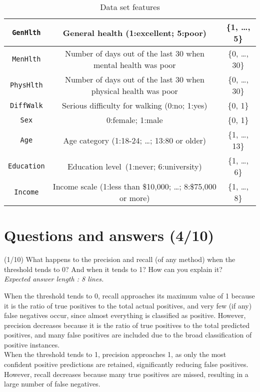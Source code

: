 \documentclass [a4paper, 11pt] {article}
\begin{document}
\begin{table}[htpb]
\begin{tabular}{|c|c|c|}
\hline
\texttt{GenHlth} & General health (1:excellent; 5:poor) & \{1, \dots, 5\} \\ 
\hline
\texttt{MenHlth} & Number of days out of the last 30 when mental health was poor & \{0, \dots, 30\} \\ 
\hline
\texttt{PhysHlth} & Number of days out of the last 30 when physical health was poor & \{0, \dots, 30\} \\ 
\hline
\texttt{DiffWalk} & Serious difficulty for walking (0:no; 1:yes) & \{0, 1\} \\ 
\hline
\texttt{Sex} & 0:female; 1:male & \{0, 1\} \\ 
\hline
\texttt{Age} & Age category (1:18-24; \dots; 13:80 or older) & \{1, \dots, 13\} \\ 
\hline
\texttt{Education} & Education level~(1:never; 6:university) & \{1, \dots, 6\} \\ 
\hline
\texttt{Income} & Income scale (1:less than \$10,000; \dots; 8:\$75,000 or more) & \{1, \dots, 8\} \\
\hline
    \end{tabular}
    \caption{Data set features}
    \label{tab:featuresList}
\end{table}
\clearpage
\section{Questions and answers (4/10)}

\begin{question}{2.1}
(1/10) What happens to the precision and recall (of any method) when the threshold tends to
0? And when it tends to 1? How can you explain it?\\
\textit{Expected answer length : 8 lines.}
\end{question}
\begin{answer}\color{blue} 
When the threshold tends to 0, recall approaches its maximum value of 1 because it is the ratio of true positives to the total actual positives, and very few (if any) false negatives occur, since almost everything is classified as positive. However, precision decreases because it is the ratio of true positives to the total predicted positives, and many false positives are included due to the broad classification of positive instances.\\

When the threshold tends to 1, precision approaches 1, as only the most confident positive predictions are retained, significantly reducing false positives. However, recall decreases because many true positives are missed, resulting in a large number of false negatives.
\end{answer}
\end{document}
